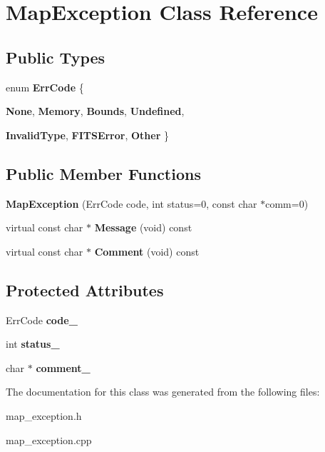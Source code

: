 \hypertarget{classMapException}{
\section{MapException Class Reference}
\label{classMapException}
}
\subsection*{Public Types}
\begin{DoxyCompactItemize}
\item 
enum {\bfseries ErrCode} \{ \par
{\bfseries None}, 
{\bfseries Memory}, 
{\bfseries Bounds}, 
{\bfseries Undefined}, 
\par
{\bfseries InvalidType}, 
{\bfseries FITSError}, 
{\bfseries Other}
 \}
\end{DoxyCompactItemize}
\subsection*{Public Member Functions}
\begin{DoxyCompactItemize}
\item 
\hypertarget{classMapException_a2856a80bedce7d662e5b04875d57a73d}{
{\bfseries MapException} (ErrCode code, int status=0, const char $\ast$comm=0)}
\label{classMapException_a2856a80bedce7d662e5b04875d57a73d}

\item 
\hypertarget{classMapException_a82fe912fe948ce506e6c12227f6a1f4c}{
virtual const char $\ast$ {\bfseries Message} (void) const }
\label{classMapException_a82fe912fe948ce506e6c12227f6a1f4c}

\item 
\hypertarget{classMapException_a25211383bb51b521440dd344046ff23a}{
virtual const char $\ast$ {\bfseries Comment} (void) const }
\label{classMapException_a25211383bb51b521440dd344046ff23a}

\end{DoxyCompactItemize}
\subsection*{Protected Attributes}
\begin{DoxyCompactItemize}
\item 
\hypertarget{classMapException_a94b5d4b4483f973cb345e14ddb9d9bdd}{
ErrCode {\bfseries code\_\-}}
\label{classMapException_a94b5d4b4483f973cb345e14ddb9d9bdd}

\item 
\hypertarget{classMapException_a3b84869995a4395ae05ee51892c4ce00}{
int {\bfseries status\_\-}}
\label{classMapException_a3b84869995a4395ae05ee51892c4ce00}

\item 
\hypertarget{classMapException_ae6b38ad1c1f2c29c374845bdf212dc15}{
char $\ast$ {\bfseries comment\_\-}}
\label{classMapException_ae6b38ad1c1f2c29c374845bdf212dc15}

\end{DoxyCompactItemize}


The documentation for this class was generated from the following files:\begin{DoxyCompactItemize}
\item 
map\_\-exception.h\item 
map\_\-exception.cpp\end{DoxyCompactItemize}

